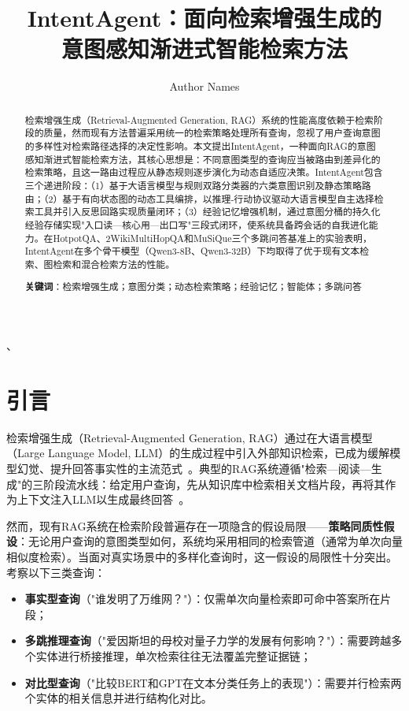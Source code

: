\documentclass[runningheads]{llncs}
\begin{document}
\title{IntentAgent：面向检索增强生成的\\意图感知渐进式智能检索方法}

\author{Author Names}

\maketitle

\begin{abstract}
检索增强生成（Retrieval-Augmented Generation, RAG）系统的性能高度依赖于检索阶段的质量，然而现有方法普遍采用统一的检索策略处理所有查询，忽视了用户查询意图的多样性对检索路径选择的决定性影响。本文提出IntentAgent，一种面向RAG的意图感知渐进式智能检索方法，其核心思想是：不同意图类型的查询应当被路由到差异化的检索策略，且这一路由过程应从静态规则逐步演化为动态自适应决策。IntentAgent包含三个递进阶段：（1）基于大语言模型与规则双路分类器的六类意图识别及静态策略路由；（2）基于有向状态图的动态工具编排，以推理-行动协议驱动大语言模型自主选择检索工具并引入反思回路实现质量闭环；（3）经验记忆增强机制，通过意图分桶的持久化经验存储实现"入口读—核心用—出口写"三段式闭环，使系统具备跨会话的自我进化能力。在HotpotQA、2WikiMultiHopQA和MuSiQue三个多跳问答基准上的实验表明，IntentAgent在多个骨干模型（Qwen3-8B、Qwen3-32B）下均取得了优于现有文本检索、图检索和混合检索方法的性能。

\textbf{关键词}：检索增强生成；意图分类；动态检索策略；经验记忆；智能体；多跳问答
\end{abstract}
 、
\section{引言}

检索增强生成（Retrieval-Augmented Generation, RAG）通过在大语言模型（Large Language Model, LLM）的生成过程中引入外部知识检索，已成为缓解模型幻觉、提升回答事实性的主流范式~\cite{ref1}。典型的RAG系统遵循"检索—阅读—生成"的三阶段流水线：给定用户查询，先从知识库中检索相关文档片段，再将其作为上下文注入LLM以生成最终回答~\cite{ref2}。

然而，现有RAG系统在检索阶段普遍存在一项隐含的假设局限——\textbf{策略同质性假设}：无论用户查询的意图类型如何，系统均采用相同的检索管道（通常为单次向量相似度检索）。当面对真实场景中的多样化查询时，这一假设的局限性十分突出。考察以下三类查询：

\begin{itemize}[leftmargin=*]
    \item \textbf{事实型查询}（"谁发明了万维网？"）：仅需单次向量检索即可命中答案所在片段；
    \item \textbf{多跳推理查询}（"爱因斯坦的母校对量子力学的发展有何影响？"）：需要跨越多个实体进行桥接推理，单次检索往往无法覆盖完整证据链；
    \item \textbf{对比型查询}（"比较BERT和GPT在文本分类任务上的表现"）：需要并行检索两个实体的相关信息并进行结构化对比。
\end{itemize}
\end{document}
